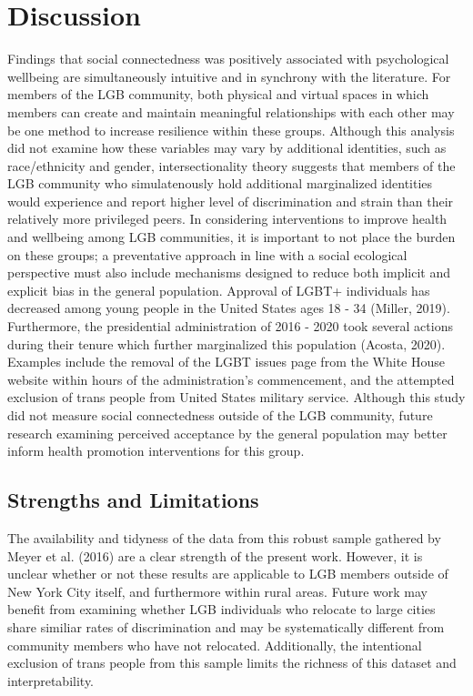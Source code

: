 \documentclass[
  english,
  man,floatsintext]{apa6}
\begin{document}
\hypertarget{discussion}{%
\section{Discussion}\label{discussion}}

Findings that social connectedness was positively associated with psychological wellbeing are simultaneously intuitive and in synchrony with the literature. For members of the LGB community, both physical and virtual spaces in which members can create and maintain meaningful relationships with each other may be one method to increase resilience within these groups. Although this analysis did not examine how these variables may vary by additional identities, such as race/ethnicity and gender, intersectionality theory suggests that members of the LGB community who simulatenously hold additional marginalized identities would experience and report higher level of discrimination and strain than their relatively more privileged peers.
In considering interventions to improve health and wellbeing among LGB communities, it is important to not place the burden on these groups; a preventative approach in line with a social ecological perspective must also include mechanisms designed to reduce both implicit and explicit bias in the general population. Approval of LGBT+ individuals has decreased among young people in the United States ages 18 - 34 (Miller, 2019). Furthermore, the presidential administration of 2016 - 2020 took several actions during their tenure which further marginalized this population (Acosta, 2020). Examples include the removal of the LGBT issues page from the White House website within hours of the administration's commencement, and the attempted exclusion of trans people from United States military service. Although this study did not measure social connectedness outside of the LGB community, future research examining perceived acceptance by the general population may better inform health promotion interventions for this group.

\hypertarget{strengths-and-limitations}{%
\subsection{Strengths and Limitations}\label{strengths-and-limitations}}

The availability and tidyness of the data from this robust sample gathered by Meyer et al. (2016) are a clear strength of the present work. However, it is unclear whether or not these results are applicable to LGB members outside of New York City itself, and furthermore within rural areas. Future work may benefit from examining whether LGB individuals who relocate to large cities share similiar rates of discrimination and may be systematically different from community members who have not relocated. Additionally, the intentional exclusion of trans people from this sample limits the richness of this dataset and interpretability.
\newpage
\end{document}
